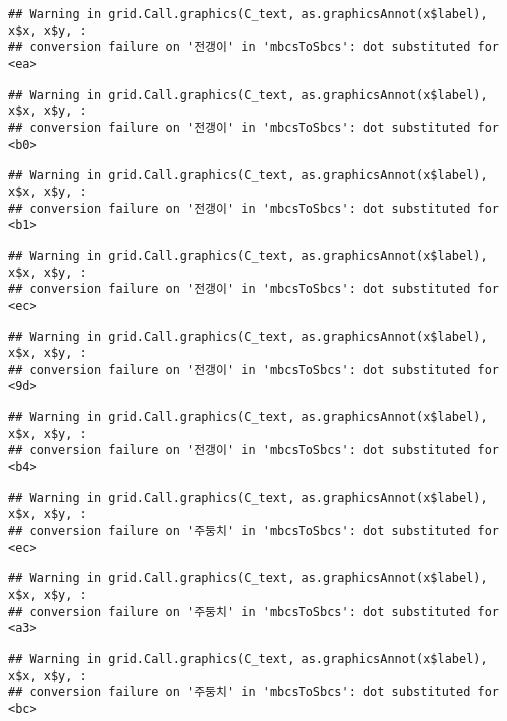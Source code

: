 \documentclass[
]{article}
\begin{document}
\begin{verbatim}
## Warning in grid.Call.graphics(C_text, as.graphicsAnnot(x$label), x$x, x$y, :
## conversion failure on '전갱이' in 'mbcsToSbcs': dot substituted for <ea>
\end{verbatim}

\begin{verbatim}
## Warning in grid.Call.graphics(C_text, as.graphicsAnnot(x$label), x$x, x$y, :
## conversion failure on '전갱이' in 'mbcsToSbcs': dot substituted for <b0>
\end{verbatim}

\begin{verbatim}
## Warning in grid.Call.graphics(C_text, as.graphicsAnnot(x$label), x$x, x$y, :
## conversion failure on '전갱이' in 'mbcsToSbcs': dot substituted for <b1>
\end{verbatim}

\begin{verbatim}
## Warning in grid.Call.graphics(C_text, as.graphicsAnnot(x$label), x$x, x$y, :
## conversion failure on '전갱이' in 'mbcsToSbcs': dot substituted for <ec>
\end{verbatim}

\begin{verbatim}
## Warning in grid.Call.graphics(C_text, as.graphicsAnnot(x$label), x$x, x$y, :
## conversion failure on '전갱이' in 'mbcsToSbcs': dot substituted for <9d>
\end{verbatim}

\begin{verbatim}
## Warning in grid.Call.graphics(C_text, as.graphicsAnnot(x$label), x$x, x$y, :
## conversion failure on '전갱이' in 'mbcsToSbcs': dot substituted for <b4>
\end{verbatim}

\begin{verbatim}
## Warning in grid.Call.graphics(C_text, as.graphicsAnnot(x$label), x$x, x$y, :
## conversion failure on '주둥치' in 'mbcsToSbcs': dot substituted for <ec>
\end{verbatim}

\begin{verbatim}
## Warning in grid.Call.graphics(C_text, as.graphicsAnnot(x$label), x$x, x$y, :
## conversion failure on '주둥치' in 'mbcsToSbcs': dot substituted for <a3>
\end{verbatim}

\begin{verbatim}
## Warning in grid.Call.graphics(C_text, as.graphicsAnnot(x$label), x$x, x$y, :
## conversion failure on '주둥치' in 'mbcsToSbcs': dot substituted for <bc>
\end{verbatim}
\end{document}
